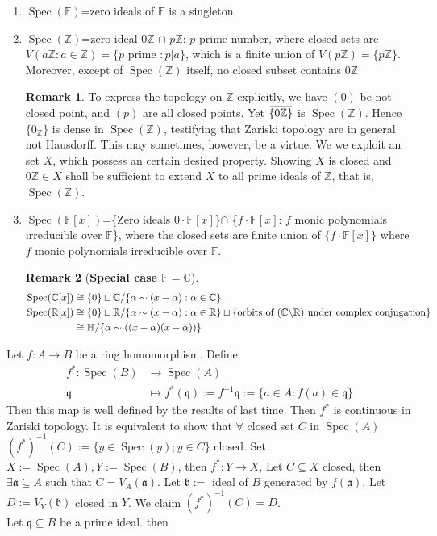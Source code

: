 \documentclass[12pt]{article}
\theoremstyle{definition}
\newtheorem*{noRmk}{Remark}
\theoremstyle{plain}
\DeclareMathOperator{\Spec}{Spec}
\newcommand{\quat}{\mathbb{H}}
\newcommand{\real}{\mathbb{R}}
\newcommand{\complex}{\mathbb{C}}
\newcommand{\z}{\mathbb{Z}}
\newcommand{\field}{\mathbb{F}}
\newcommand{\overbar}[1]{\mkern 1.5mu\overline{\mkern-1.5mu#1\mkern-1.5mu}\mkern 1.5mu}
\renewcommand{\bar}{\overbar}
\begin{document}
\begin{enumerate}
  \item $\Spec(\field)$={zero ideals of $\field$} is a singleton.
  \item $\Spec(\z)$={zero ideal $0\z$} $\cap$ {$p\z$: $p$ prime number}, where closed sets are $V(a\z: a\in \z)=\{p \text{ prime }: p|a\}$, which is a finite union of $V(p\z)=\{p\z\}$. Moreover, except of $\Spec(\z)$ itself, no closed subset contains $0\z$
\begin{noRmk}
 To express the topology on $\z$ explicitly, we have $(0)$ be not closed point, and $(p)$ are all closed points. Yet $\bar{\{0\z\}}$ is $\Spec(\z)$. Hence $\{0_\z\}$ is dense in $\Spec(\z)$, testifying that Zariski topology are in general not Hausdorff. This may sometimes, however, be a virtue. We we exploit an set $X$, which possess an certain desired property. Showing $X$ is closed and $0\z\in X$ shall be sufficient to extend $X$ to all prime ideals of $\z$, that is, $\Spec(\z)$.
 \end{noRmk}
  \item $\Spec(\field[x])$=\{Zero ideals $0\cdot \field[x]$\}$\cap$ \{$f\cdot \field[x]$: $f$ monic polynomials irreducible over $\field$\}, where the closed sets are finite union of $\{f\cdot \field[x]\}$  where $f$ monic polynomials irreducible over $\field$.
 \begin{noRmk}[\textbf{Special case $\field=\complex$}]\leavevmode
   \begin{align*}
    \Spec(\complex[x])&\cong \{0\}\sqcup \complex/\{\alpha\sim (x-\alpha):\alpha\in \complex\} \\
     \Spec(\real[x])&\cong \{0\}\sqcup \real/\{\alpha\sim(x-\alpha):\alpha\in\real\}\sqcup\{\text{orbits of }(\complex\backslash\real)\text{ under complex conjugation}\}\\
     &\cong \quat/\{\alpha\sim((x-\alpha)(x-\bar{\alpha}))\}
   \end{align*}
 \end{noRmk}
\end{enumerate}
\Prop Let $f:A\to B$ be a ring homomorphism. Define
\begin{align}
  f^*: \Spec(B)&\to \Spec(A)\\
  \mathfrak{q}& \mapsto f^*(\mathfrak{q}):=f^{-1}\mathfrak{q}:=\{a\in A: f(a)\in \mathfrak{q}\}
\end{align}
Then this map is well defined by the results of last time. Then $f^*$ is continuous in Zariski topology.
\proof It is equivalent to show that $\forall$ closed set $C$ in $\Spec(A)$ $(f^*)^{-1}(C):=\{y\in \Spec(y); y\in C\}$ closed. Set $X:=\Spec(A), Y:=\Spec(B)$, then $f^*:Y\to X$, Let $C\subseteq X$ closed, then $\exists \mathfrak{a}\subseteq A$ such that $C=V_A(\mathfrak{a})$. Let $\mathfrak{b}:=$ ideal of $B$ generated by $f(\mathfrak{a})$. Let $D:=V_Y(\mathfrak{b})$ closed in $Y$. We claim $(f^*)^{-1}(C)=D$. \\ Let $\mathfrak{q}\subseteq B$ be a prime ideal. then
\end{document}
